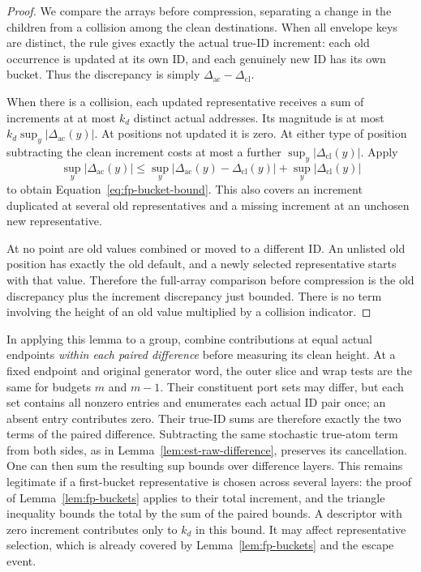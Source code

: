 \begin{proof}
We compare the arrays before compression, separating a change in the children from a collision among the clean destinations. When all envelope keys are distinct, the rule gives exactly the actual
true-ID increment: each old occurrence is updated at its own ID, and
each genuinely new ID has its own bucket.  Thus the discrepancy is
simply $\Delta_{\mathrm{ac}}-\Delta_{\mathrm{cl}}$.

When there is a collision, each updated representative receives a sum
of increments at at most $k_d$ distinct actual addresses.  Its magnitude
is at most $k_d\sup_y|\Delta_{\mathrm{ac}}(y)|$.  At positions not
updated it is zero.  At either type of position subtracting the clean
increment costs at most a further
$\sup_y|\Delta_{\mathrm{cl}}(y)|$.  Apply
\[
 \sup_y|\Delta_{\mathrm{ac}}(y)|
 \le\sup_y|\Delta_{\mathrm{ac}}(y)-\Delta_{\mathrm{cl}}(y)|
      +\sup_y|\Delta_{\mathrm{cl}}(y)|
\]
to obtain Equation~\eqref{eq:fp-bucket-bound}.  This also covers an
increment duplicated at several old representatives and a missing
increment at an unchosen new representative.

At no point are old values combined or moved to a different ID.  An
unlisted old position has exactly the old default, and a newly selected
representative starts with that value.  Therefore the full-array
comparison before compression is the old discrepancy plus the increment
discrepancy just bounded.  There is no term involving the height of an
old value multiplied by a collision indicator.
\end{proof}

In applying this lemma to a group, combine contributions at equal actual
endpoints \emph{within each paired difference} before measuring its
clean height.  At a fixed endpoint and original generator word, the
outer slice and wrap tests are the same for budgets $m$ and $m-1$.
Their constituent port sets may differ, but each set contains all
nonzero entries and enumerates each actual ID pair once; an absent
entry contributes zero.  Their true-ID sums are therefore exactly the
two terms of the paired difference.  Subtracting the same stochastic
true-atom term from both sides, as in
Lemma~\ref{lem:est-raw-difference}, preserves its cancellation.
One can then sum the resulting sup bounds over difference layers.
This remains legitimate
if a first-bucket representative is chosen across several layers:
the proof of Lemma~\ref{lem:fp-buckets} applies to their total increment,
and the triangle inequality bounds the total by the sum of the paired
bounds.  A descriptor with zero increment contributes only to $k_d$ in
this bound.  It may affect representative selection, which is already
covered by Lemma~\ref{lem:fp-buckets} and the escape event.

